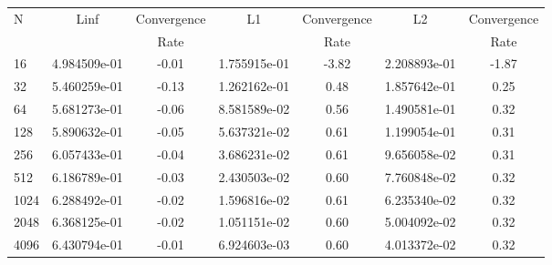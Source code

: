 \documentclass[12pt]{article}
\begin{document}
	\begin{tabular}{l|c|c|c|c|c|c}
		N&Linf&Convergence&L1&Convergence&L2&Convergence\\
		&&Rate&&Rate&&Rate\\
		\hline
		16&4.984509e-01&-0.01&1.755915e-01&-3.82&2.208893e-01&-1.87\\
		\hline
		32&5.460259e-01&-0.13&1.262162e-01&0.48&1.857642e-01&0.25\\
		\hline
		64&5.681273e-01&-0.06&8.581589e-02&0.56&1.490581e-01&0.32\\
		\hline
		128&5.890632e-01&-0.05&5.637321e-02&0.61&1.199054e-01&0.31\\
		\hline
		256&6.057433e-01&-0.04&3.686231e-02&0.61&9.656058e-02&0.31\\
		\hline
		512&6.186789e-01&-0.03&2.430503e-02&0.60&7.760848e-02&0.32\\
		\hline
		1024&6.288492e-01&-0.02&1.596816e-02&0.61&6.235340e-02&0.32\\
		\hline
		2048&6.368125e-01&-0.02&1.051151e-02&0.60&5.004092e-02&0.32\\
		\hline
		4096&6.430794e-01&-0.01&6.924603e-03&0.60&4.013372e-02&0.32\\
	\end{tabular}
\end{document}

